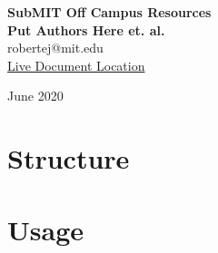 \documentclass[oneside]{book}
\begin{document}
\begin{titlepage}
\begin{center}
 {\huge\bfseries SubMIT Off Campus Resources\\}
 \vspace{1.5cm}
 {\Large\bfseries Put Authors Here et. al.}\\[5pt]
 robertej@mit.edu\\
 \href{https://latexonline.cc/compile?git=https\%3A\%2F\%2Fgithub.com\%2Frobertej19\%2FSubMITDocs\&target=main.tex\&command=pdflatex\&trackId=1594872205396}{Live Document Location}\\[14pt]
 \vspace{2cm}


 \vfill

 \vfill
{June 2020}
\end{center}
\end{titlepage}

\tableofcontents

%    
    
%    
    
\chapter{Structure}
        

\chapter{Usage}
    
    
\iffalse
\chapter{Pull Request Notes}
   


\chapter{Resources}
    
    
\fi
\end{document}
